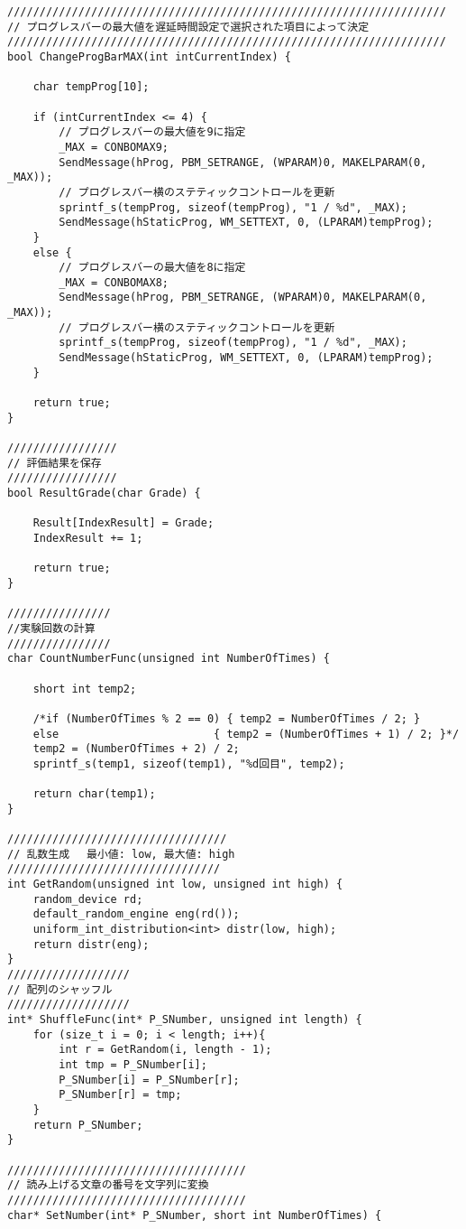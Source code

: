 \begin{verbatim}
////////////////////////////////////////////////////////////////////
// プログレスバーの最大値を遅延時間設定で選択された項目によって決定
////////////////////////////////////////////////////////////////////
bool ChangeProgBarMAX(int intCurrentIndex) {

	char tempProg[10];

	if (intCurrentIndex <= 4) {
		// プログレスバーの最大値を9に指定
		_MAX = CONBOMAX9;
		SendMessage(hProg, PBM_SETRANGE, (WPARAM)0, MAKELPARAM(0, _MAX));
		// プログレスバー横のステティックコントロールを更新
		sprintf_s(tempProg, sizeof(tempProg), "1 / %d", _MAX);
		SendMessage(hStaticProg, WM_SETTEXT, 0, (LPARAM)tempProg);
	}
	else {
		// プログレスバーの最大値を8に指定
		_MAX = CONBOMAX8;
		SendMessage(hProg, PBM_SETRANGE, (WPARAM)0, MAKELPARAM(0, _MAX));
		// プログレスバー横のステティックコントロールを更新
		sprintf_s(tempProg, sizeof(tempProg), "1 / %d", _MAX);
		SendMessage(hStaticProg, WM_SETTEXT, 0, (LPARAM)tempProg);
	}

	return true;
}

/////////////////
// 評価結果を保存
/////////////////
bool ResultGrade(char Grade) {

	Result[IndexResult] = Grade;
	IndexResult += 1;

	return true;
}

////////////////
//実験回数の計算
////////////////
char CountNumberFunc(unsigned int NumberOfTimes) {

	short int temp2;

	/*if (NumberOfTimes % 2 == 0) { temp2 = NumberOfTimes / 2; }
	else                        { temp2 = (NumberOfTimes + 1) / 2; }*/
	temp2 = (NumberOfTimes + 2) / 2;
	sprintf_s(temp1, sizeof(temp1), "%d回目", temp2);

	return char(temp1);
}

//////////////////////////////////
// 乱数生成 　最小値: low, 最大値: high
/////////////////////////////////
int GetRandom(unsigned int low, unsigned int high) {
	random_device rd;
	default_random_engine eng(rd());
	uniform_int_distribution<int> distr(low, high);
	return distr(eng);
}
///////////////////
// 配列のシャッフル
///////////////////
int* ShuffleFunc(int* P_SNumber, unsigned int length) {
	for (size_t i = 0; i < length; i++){
		int r = GetRandom(i, length - 1);
		int tmp = P_SNumber[i];
		P_SNumber[i] = P_SNumber[r];
		P_SNumber[r] = tmp;
	}
	return P_SNumber;
}

/////////////////////////////////////
// 読み上げる文章の番号を文字列に変換
/////////////////////////////////////
char* SetNumber(int* P_SNumber, short int NumberOfTimes) {


\end{verbatim}
